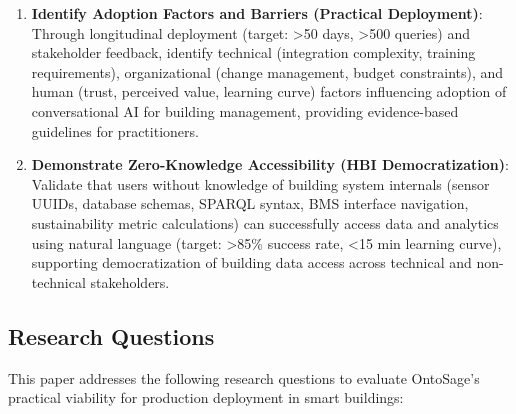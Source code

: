 \documentclass[acmlarge]{acmart}
\begin{document}
\begin{enumerate}
    \item \textbf{Identify Adoption Factors and Barriers (Practical Deployment)}: Through longitudinal deployment (target: >50 days, >500 queries) and stakeholder feedback, identify technical (integration complexity, training requirements), organizational (change management, budget constraints), and human (trust, perceived value, learning curve) factors influencing adoption of conversational AI for building management, providing evidence-based guidelines for practitioners.
    
    \item \textbf{Demonstrate Zero-Knowledge Accessibility (HBI Democratization)}: Validate that users without knowledge of building system internals (sensor UUIDs, database schemas, SPARQL syntax, BMS interface navigation, sustainability metric calculations) can successfully access data and analytics using natural language (target: >85\% success rate, <15 min learning curve), supporting democratization of building data access across technical and non-technical stakeholders.
\end{enumerate}

\subsection{Research Questions}

This paper addresses the following research questions to evaluate OntoSage's practical viability for production deployment in smart buildings:
\end{document}
